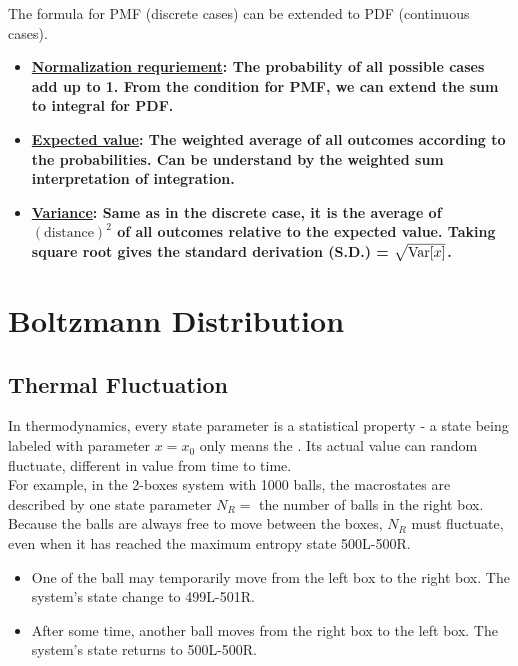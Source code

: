 \documentclass[class=article, crop=false, 12pt]{standalone}
\begin{document}
\newpage
The formula for PMF (discrete cases) can be extended to PDF (continuous cases).
\begin{itemize}
    \item \bf{\ul{Normalization requriement}}: 
    The probability of all possible cases add up to 1.
    From the condition for PMF, we can extend the sum to integral for PDF.

    \item \bf{\ul{Expected value}}: 
    The weighted average of all outcomes according to the probabilities.
    Can be understand by the weighted sum interpretation of integration.

    \item \bf{\ul{Variance}}:
    Same as in the discrete case, it is the average of $(\text{distance})^2$ of all outcomes relative to the expected value.
    Taking square root gives the standard derivation (S.D.) = $\sqrt{\Var{x}}$. 

\end{itemize}


\linesep
\section{Boltzmann Distribution}

\subsection{Thermal Fluctuation}

In thermodynamics, every state parameter is a statistical property - 
a state being labeled with parameter $x=x_0$ only means the .
Its actual value can random fluctuate, 
different in value from time to time.\\

For example, in the 2-boxes system with 1000 balls, 
the macrostates are described by one state parameter $N_R=$ the number of balls in the right box. 
Because the balls are always free to move between the boxes, 
$N_R$ must fluctuate, even when it has reached the maximum entropy state 500L-500R. 
\begin{itemize}
    \item
    One of the ball may temporarily move from the left box to the right box.
    The system's state change to 499L-501R. 

    \item After some time, another ball moves from the right box to the left box.
    The system's state returns to 500L-500R.
\end{itemize}
\end{document}
